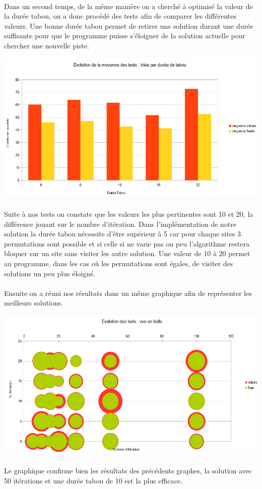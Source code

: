     \paragraph{}Dans un second temps, de la même manière on a cherché à optimisé la valeur de la
    durée tabou, on a donc procédé des tests afin de comparer les différentes valeurs.
    Une bonne durée tabou permet de retirer une solution durant une durée suffisante pour que le
    programme puisse s'éloigner de la solution actuelle pour chercher une nouvelle piste.
    \begin{center} \includegraphics[scale=1]{tableau_duree_tabou} \end{center}
    \paragraph{}Suite à nos tests on constate que les valeurs les plus pertinentes sont 10 et 20,
    la différence jouant sur le nombre d'itération. Dans l'implémentation de notre solution la durée
    tabou nécessite d'être supérieur à 5 car pour chaque sites 3 permutations sont possible et si
    celle si ne varie pas ou peu l'algorithme restera bloquer sur un site sans visiter les autre
    solution. Une valeur de 10 à 20 permet au programme, dans les cas où les permutations sont
    égales, de visiter des solutions un peu plus éloigné.


    \paragraph{}Ensuite on a réuni nos résultats dans un même graphique afin de représenter les
    meilleurs solutions.
    \begin{center} \includegraphics[scale=1]{tableau_bubulle} \end{center}
    \paragraph{}Le graphique confirme bien les résultats des précédents graphes, la solution avec 50
    itérations et une durée tabou de 10 est la plus efficace.


